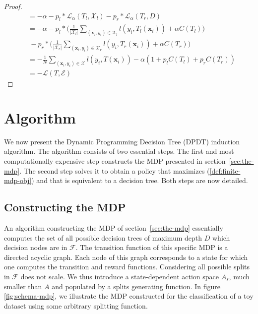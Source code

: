 \begin{proof}
\begin{align*}
   &= -\alpha - p_l * {\mathcal L}_\alpha(T_l, \mathcal{X}_l) - p_r * {\mathcal L}_\alpha(T_r, D)\\
   &= -\alpha - p_l * \Bigg(\frac{1}{|\mathcal{X}_l|}\sum_{(\boldsymbol{x}_i, y_i)\in \mathcal{X}_l}l(y_i, T_l(\boldsymbol{x}_i))  + \alpha C(T_l)\Bigg)\\
   &\ - p_r * \Bigg(\frac{1}{|\mathcal{X}_r|}\sum_{(\boldsymbol{x}_i, y_i)\in \mathcal{X}_r}l(y_i, T_r(\boldsymbol{x}_i))  + \alpha C(T_r)\Bigg)\\
   &= -\frac{1}{N}\sum_{(\boldsymbol{x}_i, y_i)\in \mathcal{X}}l(y_i, T(\boldsymbol{x}_i)) - \alpha (1 + p_l C(T_l) + p_r C(T_r))\\
   &= -{\mathcal L}(T, {\mathcal E}) 
\end{align*}
\end{proof}

\section{Algorithm}\label{sec:dpdt}

We now present the Dynamic Programming Decision Tree (DPDT) induction algorithm. 
The algorithm consists of two essential steps. The first and most computationally expensive step constructs the MDP presented in section~\ref{sec:the-mdp}. 
The second step solves it to obtain a policy that maximizes (\ref{def:finite-mdp-obj}) and that is equivalent to a decision tree. Both steps are now detailed.

\subsection{Constructing the MDP}

An algorithm constructing the MDP of section~\ref{sec:the-mdp} essentially computes the set of all possible decision trees of maximum depth $D$ which decision nodes are in $\mathcal F$. 
The transition function of this specific MDP is a directed acyclic graph. Each node of this graph corresponds to a state for which one computes the transition and reward functions. 
Considering all possible splits in $\mathcal F$ does not scale.
We thus introduce a state-dependent action space $A_s$, much smaller than $A$ and populated by a splits generating function. In figure \ref{fig:schema-mdp}, we illustrate the MDP constructed for the classification of a toy dataset using some arbitrary splitting function.

